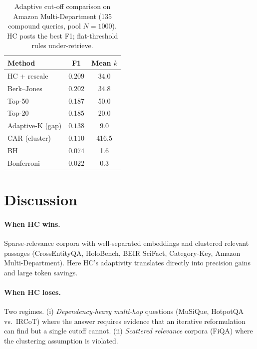\documentclass[letterpaper]{article}
\newcommand{\AlgHCF}{0.209}
\newcommand{\AlgBJF}{0.202}
\newcommand{\AlgBonfF}{0.022}
\newcommand{\AlgBHF}{0.074}
\newcommand{\AlgAdaKF}{0.138}
\newcommand{\AlgCARF}{0.110}
\begin{document}
\begin{table}[t]
\centering
\small
\begin{tabular}{lcc}
\hline
Method & F1 & Mean $k$ \\
\hline
HC + rescale     & $\AlgHCF$    & 34.0 \\
Berk--Jones      & $\AlgBJF$    & 34.8 \\
Top-50           & 0.187        & 50.0 \\
Top-20           & 0.185        & 20.0 \\
Adaptive-K (gap) & $\AlgAdaKF$  & 9.0 \\
CAR (cluster)    & $\AlgCARF$   & 416.5 \\
BH               & $\AlgBHF$    & 1.6 \\
Bonferroni       & $\AlgBonfF$  & 0.3 \\
\hline
\end{tabular}
\caption{Adaptive cut-off comparison on Amazon Multi-Department
(135 compound queries, pool $N{=}1000$). HC posts the best F1;
flat-threshold rules under-retrieve.}
\label{tab:algcomp}
\end{table}

\section{Discussion}

\paragraph{When HC wins.} Sparse-relevance corpora with
well-separated embeddings and clustered relevant passages
(CrossEntityQA, HoloBench, BEIR SciFact, Category-Key, Amazon
Multi-Department). Here HC's adaptivity translates directly into
precision gains and large token savings.

\paragraph{When HC loses.} Two regimes. (i) \emph{Dependency-heavy
multi-hop} questions (MuSiQue, HotpotQA vs.\ IRCoT) where the answer
requires evidence that an iterative reformulation can find but a
single cutoff cannot. (ii) \emph{Scattered relevance} corpora
(FiQA) where the clustering assumption is violated.
\end{document}
